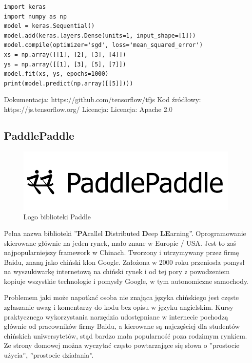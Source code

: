 \documentclass[12pt,a4paper,twoside,titlepage,openright]{book}
\begin{document}
\noindent
\begin{minipage}{\linewidth}
\begin{lstlisting}[caption=Prosty model w języku Python używając Keras, label=lst:test]
import keras
import numpy as np
model = keras.Sequential()
model.add(keras.layers.Dense(units=1, input_shape=[1]))
model.compile(optimizer='sgd', loss='mean_squared_error')
xs = np.array([[1], [2], [3], [4]])
ys = np.array([[1], [3], [5], [7]])
model.fit(xs, ys, epochs=1000)
print(model.predict(np.array([[5]])))
\end{lstlisting}
\end{minipage}

\noindent
\newline
Dokumentacja: https://github.com/tensorflow/tfjs
\newline
Kod źródłowy: https://js.tensorflow.org/
\newline
Licencja: Licencja: Apache 2.0

\subsection{PaddlePaddle}
\begin{figure}[ht]
	\centering
			\includegraphics[resolution=100, scale=1.2]{PaddlePaddle.png}
		\caption{Logo biblioteki Paddle}
\end{figure}
Pełna nazwa biblioteki ''\textbf{PA}rallel \textbf{D}istributed \textbf{D}eep \textbf{LE}arning''. Oprogramowanie skierowane głównie na jeden rynek, mało znane w Europie / USA. Jest to zaś najpopularniejszy framework w Chinach. Tworzony i utrzymywany przez firmę Baidu, znaną jako chiński klon Google. Założona w 2000 roku przeniosła pomysł na wyszukiwarkę internetową na chiński rynek i od tej pory z powodzeniem kopiuje wszystkie technologie i pomysły Google, w tym autonomiczne samochody. 

Problemem jaki może napotkać osoba nie znająca języka chińskiego jest częste zgłaszanie uwag i komentarzy do kodu bez opisu w języku angielskim. Kursy praktycznego wykorzystania narzędzia udostępniane w internecie pochodzą głównie od pracowników firmy Baidu, a kierowane są najczęściej dla studentów chińskich uniwersytetów, stąd bardzo mała popularność poza rodzimym rynkiem. Ze strony domowej można wyczytać często powtarzające się słowa o ''prostocie użycia'', ''prostocie działania''. 
\end{document}
